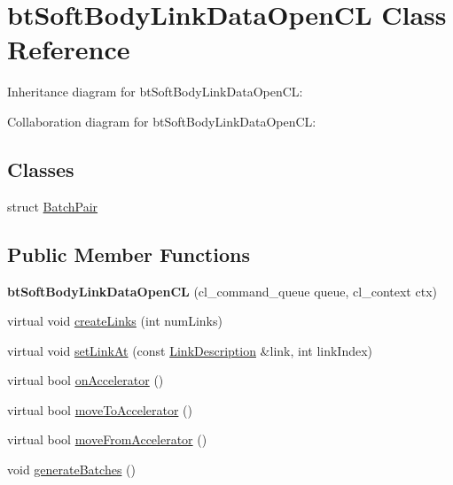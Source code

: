 \hypertarget{classbt_soft_body_link_data_open_c_l}{\section{bt\+Soft\+Body\+Link\+Data\+Open\+C\+L Class Reference}
\label{classbt_soft_body_link_data_open_c_l}
}


Inheritance diagram for bt\+Soft\+Body\+Link\+Data\+Open\+C\+L\+:


Collaboration diagram for bt\+Soft\+Body\+Link\+Data\+Open\+C\+L\+:
\subsection*{Classes}
\begin{DoxyCompactItemize}
\item 
struct \hyperlink{structbt_soft_body_link_data_open_c_l_1_1_batch_pair}{Batch\+Pair}
\end{DoxyCompactItemize}
\subsection*{Public Member Functions}
\begin{DoxyCompactItemize}
\item 
\hypertarget{classbt_soft_body_link_data_open_c_l_aaf61e26102150c1ea457e8cfdce51ba8}{{\bfseries bt\+Soft\+Body\+Link\+Data\+Open\+C\+L} (cl\+\_\+command\+\_\+queue queue, cl\+\_\+context ctx)}\label{classbt_soft_body_link_data_open_c_l_aaf61e26102150c1ea457e8cfdce51ba8}

\item 
virtual void \hyperlink{classbt_soft_body_link_data_open_c_l_a3ebb411d58ecebab84e391588f20204f}{create\+Links} (int num\+Links)
\item 
virtual void \hyperlink{classbt_soft_body_link_data_open_c_l_abef476a18a102fffd4dbb73ca2cfb9a4}{set\+Link\+At} (const \hyperlink{classbt_soft_body_link_data_1_1_link_description}{Link\+Description} \&link, int link\+Index)
\item 
virtual bool \hyperlink{classbt_soft_body_link_data_open_c_l_a3e97987329d5a5e7a4a51523fa9d4651}{on\+Accelerator} ()
\item 
virtual bool \hyperlink{classbt_soft_body_link_data_open_c_l_a6957608260f4a848712de1ad0b8f863f}{move\+To\+Accelerator} ()
\item 
virtual bool \hyperlink{classbt_soft_body_link_data_open_c_l_a47cc8710e80d8e3d00775960c358058d}{move\+From\+Accelerator} ()
\item 
void \hyperlink{classbt_soft_body_link_data_open_c_l_a4e968e65bfa4b5b1691a83fdee3ce48f}{generate\+Batches} ()
\end{DoxyCompactItemize}
